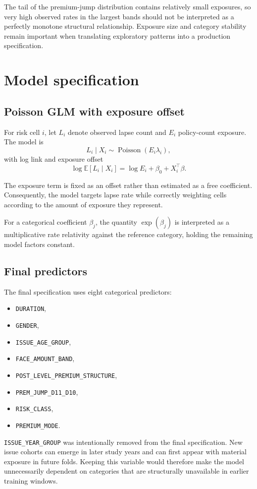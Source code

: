 \documentclass[11pt,a4paper]{article}
\theoremstyle{definition}
\newcommand{\E}{\mathbb{E}}
\begin{document}
The tail of the premium-jump distribution contains relatively small exposures, so very high observed rates in the largest bands should not be interpreted as a perfectly monotone structural relationship. Exposure size and category stability remain important when translating exploratory patterns into a production specification.

\section{Model specification}
\subsection{Poisson GLM with exposure offset}
For risk cell $i$, let $L_i$ denote observed lapse count and $E_i$ policy-count exposure. The model is
\[
L_i \mid X_i \sim \operatorname{Poisson}(E_i\lambda_i),
\]
with log link and exposure offset
\[
\log \E[L_i\mid X_i] = \log E_i + \beta_0 + X_i^\top\beta.
\]

The exposure term is fixed as an offset rather than estimated as a free coefficient. Consequently, the model targets lapse rate while correctly weighting cells according to the amount of exposure they represent.

For a categorical coefficient $\beta_j$, the quantity $\exp(\beta_j)$ is interpreted as a multiplicative rate relativity against the reference category, holding the remaining model factors constant.

\subsection{Final predictors}
The final specification uses eight categorical predictors:
\begin{itemize}
\item \texttt{DURATION},
\item \texttt{GENDER},
\item \texttt{ISSUE\_AGE\_GROUP},
\item \texttt{FACE\_AMOUNT\_BAND},
\item \texttt{POST\_LEVEL\_PREMIUM\_STRUCTURE},
\item \texttt{PREM\_JUMP\_D11\_D10},
\item \texttt{RISK\_CLASS},
\item \texttt{PREMIUM\_MODE}.
\end{itemize}

\texttt{ISSUE\_YEAR\_GROUP} was intentionally removed from the final specification. New issue cohorts can emerge in later study years and can first appear with material exposure in future folds. Keeping this variable would therefore make the model unnecessarily dependent on categories that are structurally unavailable in earlier training windows.
\end{document}
